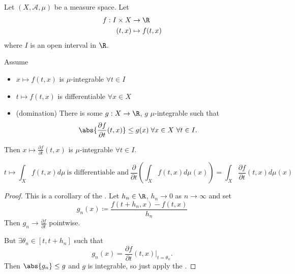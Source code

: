 \documentclass{article}
\newcommand{\1}[1]{\mathbbm{1}_{#1}}
\begin{document}
\begin{cor}
    Let $(X, \mathcal{A}, \mu)$ be a measure space.
    Let
    \begin{align*}
        f:I \times X &\to \R \\
        (t, x) &\mapsto f(t, x)
    \end{align*}
    where $I$ is an open interval in $\R$.

    Assume
    \begin{itemize}
        \item $x \mapsto f(t, x)$ is $\mu$-integrable $\forall t \in I$
        \item $t \mapsto f(t, x)$ is differentiable $\forall x \in X$
        \item (domination) There is some $g: X \to \R$, $g$ $\mu$-integrable such that
            \begin{equation*}\abs{\frac{\partial f}{\partial t}(t, x)} \leq g(x) \; \forall x \in X \ \forall t \in I.\end{equation*}
    \end{itemize}

    Then $x \mapsto \frac{\partial f}{\partial t} (t, x)$ is $\mu$-integrable $\forall t \in I$.

    \begin{equation*}
        t \mapsto \int_X f(t, x) d \mu \ \text{is differentiable and} \ \frac{\partial}{\partial t} \left( \int_X f(t, x) d \mu(x)\right) = \int_X \frac{\partial f}{\partial t} (t, x) d \mu(x)
    \end{equation*}
\end{cor}

\begin{proof}
    This is a corollary of the . Let $h_n \in \R$, $h_n \to 0$ as $n \to \infty$ and set
    \begin{equation*}
        g_n(x) \coloneqq \frac{f(t + h_n, x) - f(t, x)}{h_n}
    \end{equation*}
    Then $g_n \to \frac{\partial f}{\partial t}$ pointwise.

    But $\exists \theta_n \in [t, t+h_n]$ such that \begin{equation*}g_n(x) = \frac{\partial f}{\partial t}(t, x) \bigg|_{t=\theta_n}.\end{equation*}
    Then $\abs{g_n} \leq g$ and $g$ is integrable, so just apply the .
\end{proof}
\end{document}
